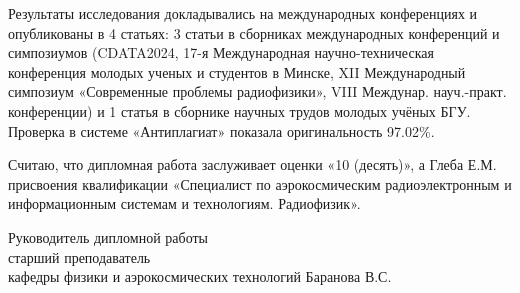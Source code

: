 \documentclass[14pt, a4paper]{bsu_review}
\begin{document}
Результаты исследования докладывались на международных конференциях и опубликованы в 4 статьях: 3 статьи в сборниках международных конференций и симпозиумов (CDATA2024, 17-я Международная научно-техническая конференция молодых ученых и студентов в Минске, XII Международный симпозиум «Современные проблемы радиофизики», VIII Междунар. науч.-практ. конференции) и 1 статья в сборнике научных трудов молодых учёных БГУ. Проверка в системе «Антиплагиат» показала оригинальность 97.02\%.

Считаю, что дипломная работа заслуживает оценки «10 (десять)», а Глеба Е.М. присвоения квалификации «Специалист по аэрокосмическим радиоэлектронным и информационным системам и технологиям. Радиофизик».

\vspace{1cm}

\noindent Руководитель дипломной работы\\
старший преподаватель\\
кафедры физики и аэрокосмических технологий
 \hfill Баранова В.С.
\end{document}
